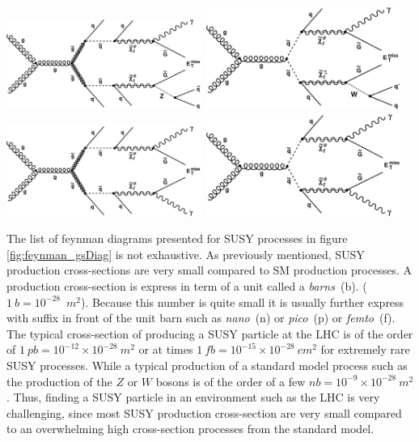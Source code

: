 {\begin{center}
\centering
\mbox{\includegraphics[width=2.5in]{THESISPLOTS/SinglePhoton_gluino.pdf} \quad \quad
\includegraphics[width=2.5in]{THESISPLOTS/SinglePhoton_squark.pdf}} \\
\hspace{0.5cm}
\mbox{\includegraphics[width=2.5in]{THESISPLOTS/Diphoton_gluino.pdf} \quad \quad
\includegraphics[width=2.5in]{THESISPLOTS/Diphoton_squark.pdf}}
\label{fig:feynman_gsDiag}
\end{center}
The list of feynman diagrams presented for SUSY processes in figure \ref{fig:feynman_gsDiag} is not exhaustive. As previously mentioned, SUSY production cross-sections are very small compared to SM production processes. A production cross-section is express in term of a unit called a \textit{barns}~(b). ($1~b = 10^{-28}$~$m^{2}$). Because this number is quite small it is usually further express with suffix in front of the unit barn such as \textit{nano}~(n) or \textit{pico}~(p) or \textit{femto}~(f). The typical cross-section of producing a SUSY particle at the LHC is of the order of $1~pb =10^{-12}\times 10^{-28}~m^{2}$ or at times $1~fb = 10^{-15}\times 10^{-28}~cm^{2}$ for extremely rare SUSY processes. While a typical production of a standard model process such as the production of the $Z$ or $W$ bosons is of the order of a few $nb = 10^{-9}\times 10^{-28}~m^{2}$. Thus, finding a SUSY particle in an environment such as the LHC is very challenging, since most SUSY production cross-section are very small compared to an overwhelming high cross-section processes from the standard model.


}
